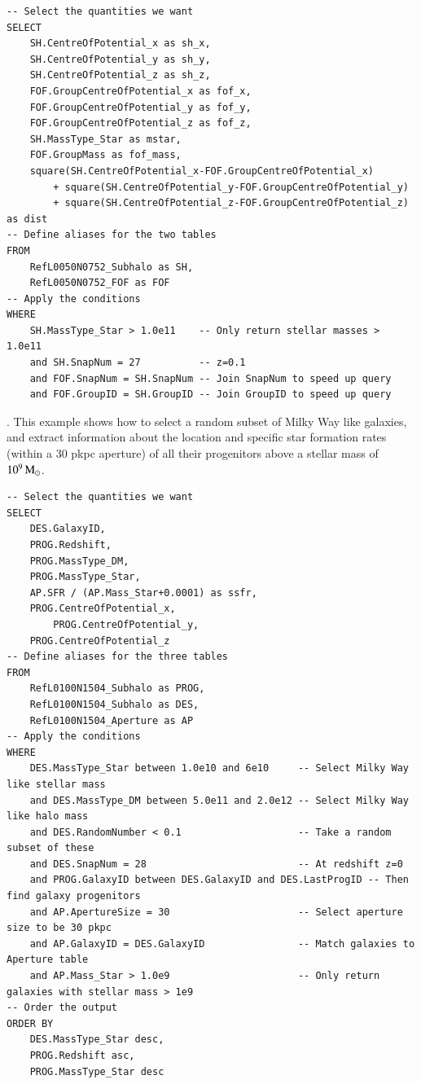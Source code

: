 \sqlstyle

\footnotesize
\begin{lstlisting}[numbers = none]
-- Select the quantities we want
SELECT              
	SH.CentreOfPotential_x as sh_x,         
	SH.CentreOfPotential_y as sh_y,         
	SH.CentreOfPotential_z as sh_z,         
	FOF.GroupCentreOfPotential_x as fof_x,         
	FOF.GroupCentreOfPotential_y as fof_y,         
	FOF.GroupCentreOfPotential_z as fof_z,
	SH.MassType_Star as mstar, 
	FOF.GroupMass as fof_mass,
	square(SH.CentreOfPotential_x-FOF.GroupCentreOfPotential_x) 
		+ square(SH.CentreOfPotential_y-FOF.GroupCentreOfPotential_y)
		+ square(SH.CentreOfPotential_z-FOF.GroupCentreOfPotential_z) as dist
-- Define aliases for the two tables
FROM  
	RefL0050N0752_Subhalo as SH,              
	RefL0050N0752_FOF as FOF
-- Apply the conditions         
WHERE  
	SH.MassType_Star > 1.0e11    -- Only return stellar masses > 1.0e11
	and SH.SnapNum = 27          -- z=0.1
	and FOF.SnapNum = SH.SnapNum -- Join SnapNum to speed up query  
	and FOF.GroupID = SH.GroupID -- Join GroupID to speed up query
\end{lstlisting}

\normalsize
{}. 
This example shows how to select a random subset of Milky Way like
galaxies, and extract information about the location and specific star
formation rates (within a 30 pkpc aperture) of all their progenitors
above a stellar mass of $10^9\, \mathrm{M}_\odot$.

\sqlstyle
\footnotesize
\begin{lstlisting}[numbers = none]
-- Select the quantities we want
SELECT
	DES.GalaxyID,
	PROG.Redshift,
	PROG.MassType_DM,
	PROG.MassType_Star, 
	AP.SFR / (AP.Mass_Star+0.0001) as ssfr, 
	PROG.CentreOfPotential_x,
    	PROG.CentreOfPotential_y,
	PROG.CentreOfPotential_z
-- Define aliases for the three tables                      
FROM 
	RefL0100N1504_Subhalo as PROG,      
	RefL0100N1504_Subhalo as DES,
	RefL0100N1504_Aperture as AP
-- Apply the conditions           
WHERE 
	DES.MassType_Star between 1.0e10 and 6e10     -- Select Milky Way like stellar mass
	and DES.MassType_DM between 5.0e11 and 2.0e12 -- Select Milky Way like halo mass
	and DES.RandomNumber < 0.1                    -- Take a random subset of these
	and DES.SnapNum = 28                          -- At redshift z=0            
	and PROG.GalaxyID between DES.GalaxyID and DES.LastProgID -- Then find galaxy progenitors
	and AP.ApertureSize = 30                      -- Select aperture size to be 30 pkpc            
	and AP.GalaxyID = DES.GalaxyID                -- Match galaxies to Aperture table
	and AP.Mass_Star > 1.0e9                      -- Only return galaxies with stellar mass > 1e9
-- Order the output
ORDER BY 
	DES.MassType_Star desc,
	PROG.Redshift asc,
	PROG.MassType_Star desc
\end{lstlisting}
\twocolumn


